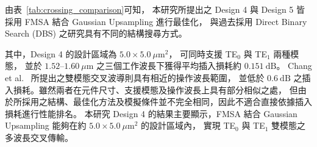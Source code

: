 \begin{table}[H]
\centering
{}
\caption{Summary of the proposed waveguide crossing designs and related previous works.}
\label{tab:crossing_comparison}
\end{table}

由表~\ref{tab:crossing_comparison}可知，
本研究所提出之 Design 4 與 Design 5
皆採用 FMSA 結合 Gaussian Upsampling 進行最佳化，
與過去採用 Direct Binary Search (DBS) 之研究具有不同的結構搜尋方式。

其中，Design 4 的設計區域為 $5.0\times5.0~\mu\mathrm{m}^{2}$，
可同時支援 TE$_0$ 與 TE$_1$ 兩種模態，
並於 $1.52$--$1.60~\mu\mathrm{m}$ 之三個工作波長下獲得平均插入損耗約 $0.151~\mathrm{dB}$。
Chang et al.~\cite{Chang:18} 所提出之雙模態交叉波導則具有相近的操作波長範圍，
並低於 $0.6~\mathrm{dB}$ 之插入損耗。雖然兩者在元件尺寸、支援模態及操作波長上具有部分相似之處，
但由於所採用之結構、最佳化方法及模擬條件並不完全相同，因此不適合直接依據插入損耗進行性能排名。
本研究 Design 4 的結果主要顯示，FMSA 結合 Gaussian Upsampling 能夠在約 $5.0\times5.0~\mu\mathrm{m}^{2}$ 的設計區域內，
實現 TE$_0$ 與 TE$_1$ 雙模態之多波長交叉傳輸。

